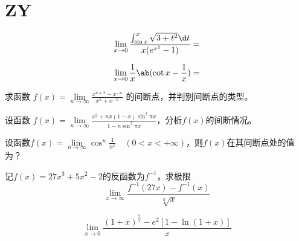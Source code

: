 \section{ZY}
\begin{question}
    \begin{equation}
        \nonumber
        \lim\limits_{ x \to 0 } \frac{ \int_{\sin x}^{x} \sqrt{ 3 + t^2 } \d t }{ x ( e^{x^2} - 1 ) } = 
    \end{equation}
\end{question}

\begin{question}
    \begin{equation}
        \nonumber
        \lim\limits_{ x \to 0 } \frac{1}{x} \ab( \cot x - \frac{1}{x} ) = 
    \end{equation}
\end{question}

\begin{question}
    求函数 $ f(x) = \lim\limits_{ n \to \infty } \frac{ x^{ n + 2 } - x^{ -n } }{ x^n + x^{ -n } } $ 的间断点，并判别间断点的类型。
\end{question}

\begin{question}
    设函数 $ f(x) = \lim\limits_{ n \to \infty } \frac{ x^2 + nx( 1 - x ) \sin ^2 \pi x }{ 1 - n \sin^2 \pi x } $，分析$ f(x) $的间断情况。 
\end{question}

\begin{question}
    设函数$ f(x) =\lim\limits_{ n \to \infty } \cos^n \frac{ 1 }{ n^x } \quad (0 < x < + \infty) $，则$ f(x) $在其间断点处的值为？
\end{question}

\begin{question}
    记$ f(x) = 27x^3 + 5x^2 - 2 $的反函数为$ f^{-1} $，求极限
    \begin{equation}
        \nonumber
        \lim\limits_{ x \to \infty } \frac{ f^{-1} (27x) - f^{-1} (x) }{ \sqrt[3]{x} }
    \end{equation}
\end{question}

\begin{question}
    \begin{equation}
        \nonumber
        \lim\limits_{x \to 0} \frac{ (1 + x) ^ \frac{2}{x} - e^2 [1 - \ln(1 + x)] }{x}
    \end{equation}
\end{question}

